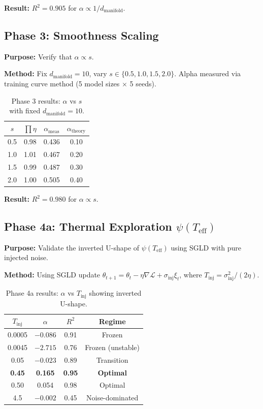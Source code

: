 \documentclass[11pt, a4paper]{article}
\theoremstyle{definition}
\begin{document}
\textbf{Result:} $R^2 = 0.905$ for $\alpha \propto 1/d_{\text{manifold}}$.

\subsection{Phase 3: Smoothness Scaling}
\label{sec:phase3}

\textbf{Purpose:} Verify that $\alpha \propto s$.

\textbf{Method:} Fix $d_{\text{manifold}}=10$, vary $s \in \{0.5, 1.0, 1.5, 2.0\}$. Alpha measured via training curve method (5 model sizes $\times$ 5 seeds).

\begin{table}[htbp]
\centering
\caption{Phase 3 results: $\alpha$ vs $s$ with fixed $d_{\text{manifold}}=10$.}
\label{tab:phase3_results}
\begin{tabular}{@{}cccc@{}}
\toprule
$s$ & $\prod\eta$ & $\alpha_{\text{meas}}$ & $\alpha_{\text{theory}}$ \\
\midrule
0.5 & 0.98 & 0.436 & 0.10 \\
1.0 & 1.01 & 0.467 & 0.20 \\
1.5 & 0.99 & 0.487 & 0.30 \\
2.0 & 1.00 & 0.505 & 0.40 \\
\bottomrule
\end{tabular}
\end{table}

\textbf{Result:} $R^2 = 0.980$ for $\alpha \propto s$.

\subsection{Phase 4a: Thermal Exploration $\psi(T_{\text{eff}})$}
\label{sec:phase4a}

\textbf{Purpose:} Validate the inverted U-shape of $\psi(T_{\text{eff}})$ using SGLD with pure injected noise.

\textbf{Method:} Using SGLD update $\theta_{t+1} = \theta_t - \eta\nabla\mathcal{L} + \sigma_{\text{inj}}\xi_t$, where $T_{\text{inj}} = \sigma_{\text{inj}}^2 / (2\eta)$.

\begin{table}[htbp]
\centering
\caption{Phase 4a results: $\alpha$ vs $T_{\text{inj}}$ showing inverted U-shape.}
\label{tab:phase4a_results}
\begin{tabular}{@{}cccc@{}}
\toprule
$T_{\text{inj}}$ & $\alpha$ & $R^2$ & \textbf{Regime} \\
\midrule
0.0005 & $-0.086$ & 0.91 & Frozen \\
0.0045 & $-2.715$ & 0.76 & Frozen (unstable) \\
0.05 & $-0.023$ & 0.89 & Transition \\
\textbf{0.45} & \textbf{0.165} & \textbf{0.95} & \textbf{Optimal} \\
0.50 & 0.054 & 0.98 & Optimal \\
4.5 & $-0.002$ & 0.45 & Noise-dominated \\
\bottomrule
\end{tabular}
\end{table}
\end{document}
